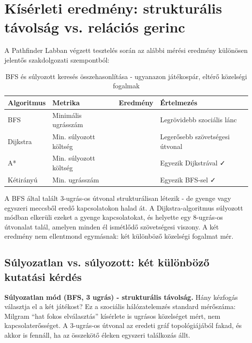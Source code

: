 ﻿\documentclass[a4paper,12pt]{report}
\begin{document}
\section{Kísérleti eredmény: strukturális távolság vs. relációs gerinc}

A Pathfinder Labban végzett tesztelés során az alábbi mérési eredmény különösen jelentős szakdolgozati szempontból:

\begin{table}[H]
\centering
\caption{BFS és súlyozott keresés összehasonlítása - ugyanazon játékospár, eltérő közelségi fogalmak}
\begin{tabularx}{\textwidth}{>{\raggedright\arraybackslash}p{3cm} >{\raggedright\arraybackslash}p{3cm} >{\raggedright\arraybackslash}p{2cm} X}
\toprule
\textbf{Algoritmus} & \textbf{Metrika} & \textbf{Eredmény} & \textbf{Értelmezés} \\
\midrule
BFS & Minimális ugrásszám & 3 & Legrövidebb szociális lánc \\
Dijkstra & Min. súlyozott költség & 8 & Legerősebb szövetségesi útvonal \\
A* & Min. súlyozott költség & 8 & Egyezik Dijkstrával ✓ \\
Kétirányú & Min. ugrásszám & 3 & Egyezik BFS-sel ✓ \\
\bottomrule
\end{tabularx}
\end{table}

A BFS által talált 3-ugrás-os útvonal strukturálisan létezik - de gyenge vagy egyszeri meccsből eredő kapcsolatokon halad át. A Dijkstra-algoritmus súlyozott módban elkerüli ezeket a gyenge kapcsolatokat, és helyette egy 8-ugrás-os útvonalat talál, amelyen minden él ismétlődő szövetségesi viszony. A két eredmény nem ellentmond egymásnak: két különböző közelségi fogalmat mér.

\subsection{Súlyozatlan vs. súlyozott: két különböző kutatási kérdés}

\textbf{Súlyozatlan mód (BFS, 3 ugrás) - strukturális távolság.} Hány kézfogás választja el a két játékost? Ez a szociális hálózatelemzés standard mérőszáma: Milgram \cite{milgram1967} ``hat fokos elválasztás'' kísérlete is ugrásos közelséget mért, nem kapcsolaterősséget. A 3-ugrás-os útvonal az eredeti gráf topológiájából fakad, és akkor is fennáll, ha az összekötő éleken egyszeri találkozás állt.
\end{document}
